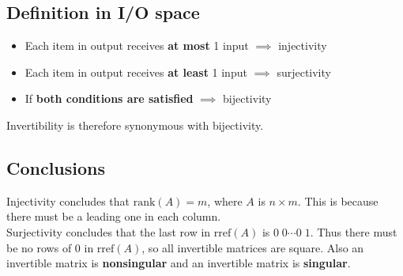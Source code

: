 \subsection{Definition in I/O space}

\begin{itemize}
    \item Each item in output receives \textbf{at most} 1 input $\implies$ injectivity
    \item Each item in output receives \textbf{at least} 1 input $\implies$ surjectivity
    \item If \textbf{both conditions are satisfied} $\implies$ bijectivity
\end{itemize}

Invertibility is therefore synonymous with bijectivity.

\subsection{Conclusions}

Injectivity concludes that $\mathrm{rank}(A)=m$, where $A$ is $n\times m$. This is because
there must be a leading one in each column.\\ 

Surjectivity concludes that the last row in $\mathrm{rref}(A)$ is $0\;0\cdots 0\;1$.
Thus there must be no rows of 0 in $\mathrm{rref}(A)$, so all invertible matrices are square. Also
an invertible matrix is \textbf{nonsingular} and an invertible matrix is \textbf{singular}.